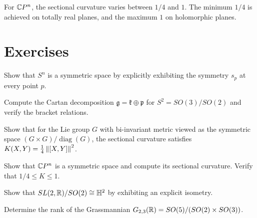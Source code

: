 \begin{remark}
For $\mathbb{C} P^n$, the sectional curvature varies between $1/4$ and $1$. The minimum
$1/4$ is achieved on totally real planes, and the maximum $1$ on holomorphic planes.
\end{remark}

\section{Exercises}

\begin{exercise}
Show that $S^n$ is a symmetric space by explicitly exhibiting the symmetry $s_p$
at every point $p$.
\end{exercise}

\begin{exercise}
Compute the Cartan decomposition $\mathfrak{g} = \mathfrak{k} \oplus \mathfrak{p}$
for $S^2 = SO(3)/SO(2)$ and verify the bracket relations.
\end{exercise}

\begin{exercise}
Show that for the Lie group $G$ with bi-invariant metric viewed as the symmetric
space $(G \times G)/\operatorname{diag}(G)$, the sectional curvature satisfies
$K(X,Y) = \frac{1}{4}\left\| [X,Y] \right\|^2$.
\end{exercise}

\begin{exercise}
Show that $\mathbb{C} P^n$ is a symmetric space and compute its sectional curvature.
Verify that $1/4 \leq K \leq 1$.
\end{exercise}

\begin{exercise}
Show that $SL(2,\mathbb{R})/SO(2) \cong \mathbb{H}^2$ by exhibiting an explicit isometry.
\end{exercise}

\begin{exercise}
Determine the rank of the Grassmannian $G_{2,3}(\mathbb{R}) = SO(5)/(SO(2) \times SO(3))$.
\end{exercise}
